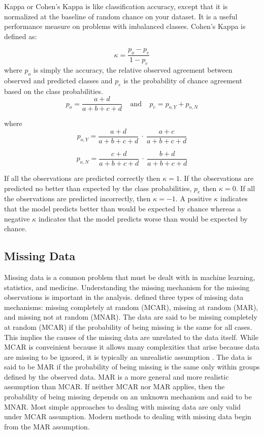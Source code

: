 \documentclass[12pt,]{article}
\begin{document}
Kappa or Cohen's Kappa is like classification accuracy, except that it
is normalized at the baseline of random chance on your dataset. It is a
useful performance measure on problems with imbalanced classes. Cohen's
Kappa is defined as:

\[
\kappa = \frac{p_o - p_e}{1 - p_e}
\] where \(p_o\) is simply the accuracy, the relative observed agreement
between observed and predicted classes and \(p_e\) is the probability of
chance agreement based on the class probabilities. \[
p_o = \frac{a+d}{a+b+c+d}  ~~~~~\text{and}~~~~~ p_e = p_{o,Y} + p_{o,N} 
\]

where \[
p_{o,Y} = \frac{a+d}{a+b+c+d} ~\cdot~ \frac{a+c}{a+b+c+d}
\]

\[
p_{o,N} = \frac{c+d}{a+b+c+d} ~\cdot~ \frac{b+d}{a+b+c+d}
\]

If all the observations are predicted correctly then \(\kappa=1\). If
the observations are predicted no better than expected by the class
probabilities, \(p_e\) then \(\kappa=0\). If all the observations are
predicted incorrectly, then \(\kappa=-1\). A positive \(\kappa\)
indicates that the model predicts better than would be expected by
chance whereas a negative \(\kappa\) indicates that the model predicts
worse than would be expected by chance.

\subsection{Missing Data}\label{missing-data}

Missing data is a common problem that must be dealt with in machine
learning, statistics, and medicine. Understanding the missing mechanism
for the missing observations is important in the analysis.
\citep{rubin_inference_1976} defined three types of missing data
mechanisms: missing completely at random (MCAR), missing at random
(MAR), and missing not at random (MNAR). The data are said to be missing
completely at random (MCAR) if the probability of being missing is the
same for all cases. This implies the causes of the missing data are
unrelated to the data itself. While MCAR is conveinient because it
allows many complexities that arise because data are missing to be
ignored, it is typically an unrealistic assumption
\citep{van_buuren_flexible_2012}. The data is said to be MAR if the
probability of being missing is the same only within groups defined by
the observed data. MAR is a more general and more realistic assumption
than MCAR. If neither MCAR nor MAR applies, then the probability of
being missing depends on an unknown mechanism and said to be MNAR. Most
simple approaches to dealing with missing data are only valid under MCAR
assumption. Modern methods to dealing with missing data begin from the
MAR assumption.
\end{document}

